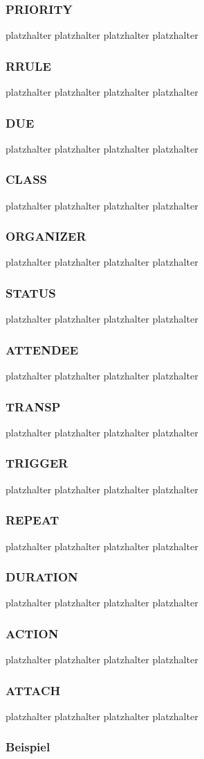 \subsubsection{PRIORITY}
\label{sec:priority}
platzhalter platzhalter platzhalter platzhalter 
\subsubsection{RRULE}
\label{sec:rrule}
platzhalter platzhalter platzhalter platzhalter 
\subsubsection{DUE}
\label{sec:due}
platzhalter platzhalter platzhalter platzhalter 
\subsubsection{CLASS}
\label{sec:class}
platzhalter platzhalter platzhalter platzhalter 
\subsubsection{ORGANIZER}
\label{sec:organizer}
platzhalter platzhalter platzhalter platzhalter 
\subsubsection{STATUS}
\label{sec:status}
platzhalter platzhalter platzhalter platzhalter 
\subsubsection{ATTENDEE}
\label{sec:attendee}
platzhalter platzhalter platzhalter platzhalter 
\subsubsection{TRANSP}
\label{sec:transp}
platzhalter platzhalter platzhalter platzhalter 
\subsubsection{TRIGGER}
\label{sec:trigger}
platzhalter platzhalter platzhalter platzhalter 
\subsubsection{REPEAT}
\label{sec:repeat}
platzhalter platzhalter platzhalter platzhalter 
\subsubsection{DURATION}
\label{sec:duration}
platzhalter platzhalter platzhalter platzhalter 
\subsubsection{ACTION}
\label{sec:action}
platzhalter platzhalter platzhalter platzhalter 
\subsubsection{ATTACH}
\label{sec:attach}
platzhalter platzhalter platzhalter platzhalter 
\subsubsection{Beispiel}
\label{sec:beispiel_ical}


